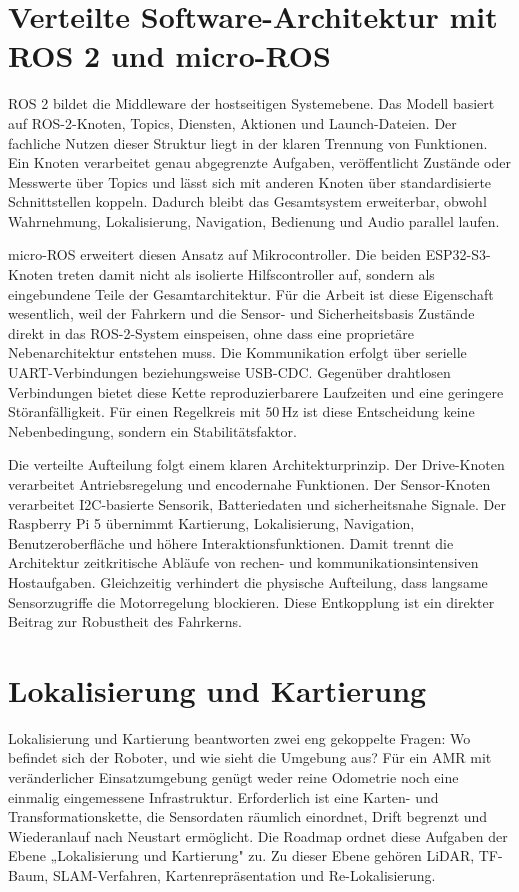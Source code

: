 \section{Verteilte Software-Architektur mit ROS 2 und micro-ROS}

ROS 2 bildet die Middleware der hostseitigen Systemebene. Das Modell basiert auf ROS-2-Knoten, Topics, Diensten, Aktionen und Launch-Dateien. Der fachliche Nutzen dieser Struktur liegt in der klaren Trennung von Funktionen. Ein Knoten verarbeitet genau abgegrenzte Aufgaben, veröffentlicht Zustände oder Messwerte über Topics und lässt sich mit anderen Knoten über standardisierte Schnittstellen koppeln. Dadurch bleibt das Gesamtsystem erweiterbar, obwohl Wahrnehmung, Lokalisierung, Navigation, Bedienung und Audio parallel laufen.

micro-ROS erweitert diesen Ansatz auf Mikrocontroller. Die beiden ESP32-S3-Knoten treten damit nicht als isolierte Hilfscontroller auf, sondern als eingebundene Teile der Gesamtarchitektur. Für die Arbeit ist diese Eigenschaft wesentlich, weil der Fahrkern und die Sensor- und Sicherheitsbasis Zustände direkt in das ROS-2-System einspeisen, ohne dass eine proprietäre Nebenarchitektur entstehen muss. Die Kommunikation erfolgt über serielle UART-Verbindungen beziehungsweise USB-CDC. Gegenüber drahtlosen Verbindungen bietet diese Kette reproduzierbarere Laufzeiten und eine geringere Störanfälligkeit. Für einen Regelkreis mit $50\,\mathrm{Hz}$ ist diese Entscheidung keine Nebenbedingung, sondern ein Stabilitätsfaktor.

Die verteilte Aufteilung folgt einem klaren Architekturprinzip. Der Drive-Knoten verarbeitet Antriebsregelung und encodernahe Funktionen. Der Sensor-Knoten verarbeitet I2C-basierte Sensorik, Batteriedaten und sicherheitsnahe Signale. Der Raspberry Pi 5 übernimmt Kartierung, Lokalisierung, Navigation, Benutzeroberfläche und höhere Interaktionsfunktionen. Damit trennt die Architektur zeitkritische Abläufe von rechen- und kommunikationsintensiven Hostaufgaben. Gleichzeitig verhindert die physische Aufteilung, dass langsame Sensorzugriffe die Motorregelung blockieren. Diese Entkopplung ist ein direkter Beitrag zur Robustheit des Fahrkerns.

\section{Lokalisierung und Kartierung}

Lokalisierung und Kartierung beantworten zwei eng gekoppelte Fragen: Wo befindet sich der Roboter, und wie sieht die Umgebung aus? Für ein AMR mit veränderlicher Einsatzumgebung genügt weder reine Odometrie noch eine einmalig eingemessene Infrastruktur. Erforderlich ist eine Karten- und Transformationskette, die Sensordaten räumlich einordnet, Drift begrenzt und Wiederanlauf nach Neustart ermöglicht. Die Roadmap ordnet diese Aufgaben der Ebene „Lokalisierung und Kartierung" zu. Zu dieser Ebene gehören LiDAR, TF-Baum, SLAM-Verfahren, Kartenrepräsentation und Re-Lokalisierung.

